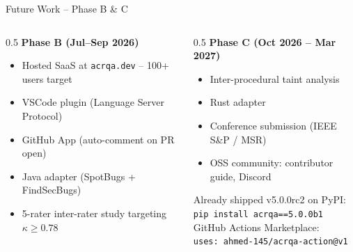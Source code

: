 \documentclass[aspectratio=169,12pt]{beamer}
\begin{document}
\begin{frame}{Future Work -- Phase B \& C}
  \begin{columns}[T]
    \begin{column}{0.5\textwidth}
      \textbf{Phase B (Jul--Sep 2026)}
      \begin{itemize}\small
        \item Hosted SaaS at \texttt{acrqa.dev} -- 100+ users target
        \item VSCode plugin (Language Server Protocol)
        \item GitHub App (auto-comment on PR open)
        \item Java adapter (SpotBugs + FindSecBugs)
        \item 5-rater inter-rater study targeting $\kappa \geq 0.78$
      \end{itemize}
    \end{column}
    \begin{column}{0.5\textwidth}
      \textbf{Phase C (Oct 2026 -- Mar 2027)}
      \begin{itemize}\small
        \item Inter-procedural taint analysis
        \item Rust adapter
        \item Conference submission (IEEE S\&P / MSR)
        \item OSS community: contributor guide, Discord
      \end{itemize}
      \vspace{6pt}
      \begin{exampleblock}{Already shipped}
        v5.0.0rc2 on PyPI:\\
        \texttt{pip install acrqa==5.0.0b1}\\
        GitHub Actions Marketplace:\\
        \texttt{uses: ahmed-145/acrqa-action@v1}
      \end{exampleblock}
    \end{column}
  \end{columns}
\end{frame}
\end{document}
